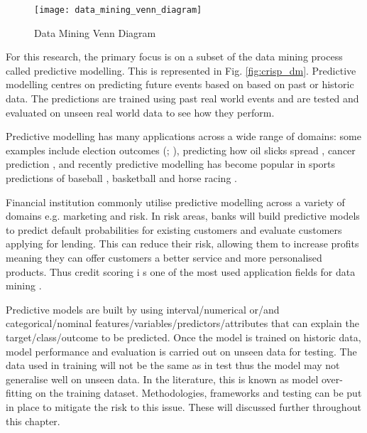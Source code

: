 \begin{figure}[H]
	\texttt{[image: data\_mining\_venn\_diagram]}
	\caption{Data Mining Venn Diagram}
	\label{fig:data_mining_venn_diagram}
\end{figure}

For this research, the primary focus is on a subset of the data mining process called predictive modelling. This is represented in Fig. \ref{fig:crisp_dm}. Predictive modelling centres on predicting future events based on based on past or historic data. The predictions are trained using past real world events and are tested and evaluated on unseen real world data to see how they perform. 

Predictive modelling has many applications across a wide range of domains: some examples include election outcomes (\citep{silver_signal_2012}; \cite{tumasjan_predicting_2010}), predicting how oil slicks spread \citep{liu_tracking_2011}, cancer prediction \citep{delen_predicting_2005}, and recently predictive modelling has become popular in sports predictions of baseball \citep{lewis_moneyball_2004}, basketball \citep{stekler_predicting_2012} and horse racing \citep{silverman_predicting_2013}.
 

Financial institution commonly utilise predictive modelling across a variety of domains e.g. marketing and risk. In risk areas, banks will build predictive models to predict default probabilities for existing customers and evaluate customers applying for lending. This can reduce their risk, allowing them to increase profits meaning they can offer customers a better service and more personalised products. Thus credit scoring i s one of the most used application fields for data mining \citep{baesens_50_2009}.

Predictive models are built by using interval/numerical or/and categorical/nominal features/variables/predictors/attributes that can explain the target/class/outcome to be predicted. Once the model is trained on historic data, model performance and evaluation is carried out on unseen data for testing. The data used in training will not be the same as in test thus the model may not generalise well on unseen data. In the literature, this is known as model over-fitting on the training dataset. Methodologies, frameworks and testing can be put in place to mitigate the risk to this issue. These will discussed further throughout this chapter.


